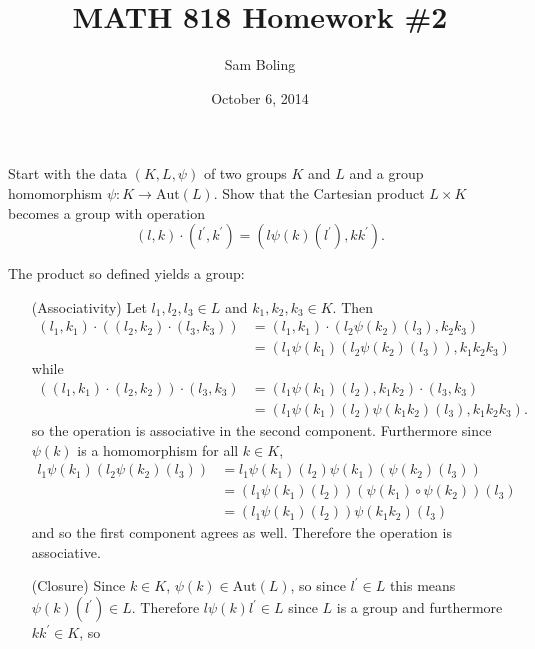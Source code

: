 \documentclass{article}
\title{MATH 818 Homework \#2}
\date{October 6, 2014}
\author{Sam Boling}
\newcounter{Problem}
\newenvironment{Problem}{\begin{Exercise}[name={Problem},
                                          counter={Problem}]}
                        {\end{Exercise}}
\begin{document}
\begin{titlepage}
\maketitle
\end{titlepage}

\begin{Problem}
Start with the data $(K, L, \psi)$ of two groups $K$ and $L$ and a
group homomorphism $\psi : K \to \mathrm{Aut}(L)$. Show that the
Cartesian product $L \times K$ becomes a group with operation
$$
(l, k) \cdot (l^\prime, k^\prime) = (l\psi(k)(l^\prime), k k^\prime).
$$
\end{Problem}

\begin{Answer}
The product so defined yields a group:
\begin{itemize}
  \item[(Associativity)]
    {Let $l_1, l_2, l_3 \in L$ and $k_1, k_2, k_3 \in K$. Then
     \begin{align*}
       (l_1, k_1) \cdot ((l_2, k_2) \cdot (l_3, k_3))
    &= (l_1, k_1) \cdot
       (l_2 \psi(k_2) (l_3), k_2 k_3) \\
    &= (l_1 \psi(k_1)(l_2 \psi(k_2) (l_3)), k_1 k_2 k_3)
    \end{align*}
    while
    \begin{align*}
      ((l_1, k_1) \cdot (l_2, k_2)) \cdot (l_3, k_3)
   &= (l_1 \psi(k_1)(l_2), k_1 k_2) \cdot (l_3, k_3) \\
   &= (l_1 \psi(k_1)(l_2)
       \psi(k_1 k_2) (l_3), k_1 k_2 k_3).
    \end{align*}
    so the operation is associative in the second component.
    Furthermore since $\psi(k)$ is a homomorphism for all $k \in K$,
    \begin{align*}
     l_1 \psi(k_1)(l_2 \psi(k_2)(l_3))
  &= l_1 \psi(k_1)(l_2) \psi(k_1)(\psi(k_2)(l_3)) \\
  &= (l_1 \psi(k_1)(l_2))
      (\psi(k_1) \circ \psi(k_2))(l_3)\\
  &= (l_1 \psi(k_1)(l_2))
      \psi(k_1 k_2)(l_3)
     \end{align*}
     and so the first component agrees as well. Therefore the
     operation is associative.
    }
  \item[(Closure)]
    {
      Since $k \in K$, $\psi(k) \in \mathrm{Aut}(L)$, so
      since $l^\prime \in L$ this means $\psi(k)(l^\prime) \in
      L$. Therefore $l \psi(k) l^\prime \in L$ since $L$ is a group
      and furthermore $k k^\prime \in K$, so
}
\end{itemize}
\end{Answer}
\end{document}
